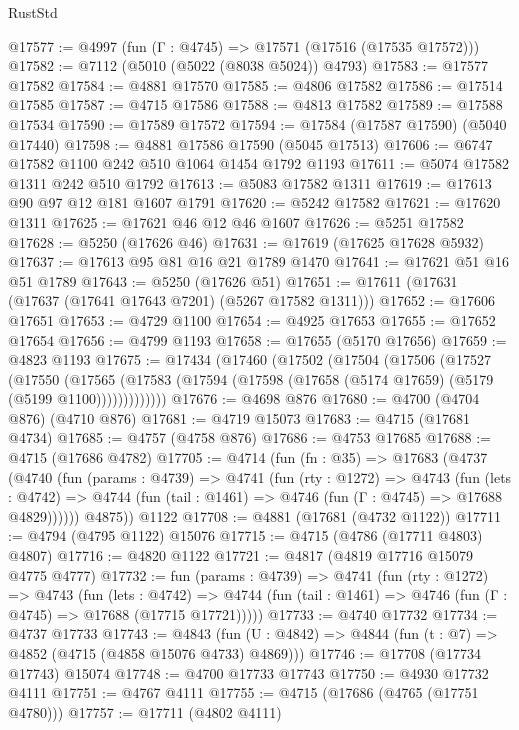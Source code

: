 \begin{lexlean}{RustStd}
\begin{coremodule}
@17577 := @4997 (fun (Γ : @4745) => @17571 (@17516 (@17535 @17572)))
@17582 := @7112 (@5010 (@5022 (@8038 @5024)) @4793)
@17583 := @17577 @17582
@17584 := @4881 @17570
@17585 := @4806 @17582
@17586 := @17514 @17585
@17587 := @4715 @17586
@17588 := @4813 @17582
@17589 := @17588 @17534
@17590 := @17589 @17572
@17594 := @17584 (@17587 @17590) (@5040 @17440)
@17598 := @4881 @17586 @17590 (@5045 @17513)
@17606 := @6747 @17582 @1100 @242 @510 @1064 @1454 @1792 @1193
@17611 := @5074 @17582 @1311 @242 @510 @1792
@17613 := @5083 @17582 @1311
@17619 := @17613 @90 @97 @12 @181 @1607 @1791
@17620 := @5242 @17582
@17621 := @17620 @1311
@17625 := @17621 @46 @12 @46 @1607
@17626 := @5251 @17582
@17628 := @5250 (@17626 @46)
@17631 := @17619 (@17625 @17628 @5932)
@17637 := @17613 @95 @81 @16 @21 @1789 @1470
@17641 := @17621 @51 @16 @51 @1789
@17643 := @5250 (@17626 @51)
@17651 := @17611 (@17631 (@17637 (@17641 @17643 @7201) (@5267 @17582 @1311)))
@17652 := @17606 @17651
@17653 := @4729 @1100
@17654 := @4925 @17653
@17655 := @17652 @17654
@17656 := @4799 @1193
@17658 := @17655 (@5170 @17656)
@17659 := @4823 @1193
@17675 := @17434
    (@17460
      (@17502
        (@17504
          (@17506
            (@17527
              (@17550
                (@17565
                  (@17583 (@17594 (@17598 (@17658 (@5174 @17659) (@5179 (@5199 @1100)))))))))))))
@17676 := @4698 @876
@17680 := @4700 (@4704 @876) (@4710 @876)
@17681 := @4719 @15073
@17683 := @4715 (@17681 @4734)
@17685 := @4757 (@4758 @876)
@17686 := @4753 @17685
@17688 := @4715 (@17686 @4782)
@17705 := @4714
    (fun (fn : @35) =>
    @17683
      (@4737
        (@4740
          (fun (params : @4739) =>
          @4741
            (fun (rty : @1272) =>
            @4743
              (fun (lets : @4742) =>
              @4744 (fun (tail : @1461) => @4746 (fun (Γ : @4745) => @17688 @4829))))))
        @4875))
    @1122
@17708 := @4881 (@17681 (@4732 @1122))
@17711 := @4794 (@4795 @1122) @15076
@17715 := @4715 (@4786 (@17711 @4803) @4807)
@17716 := @4820 @1122
@17721 := @4817 (@4819 @17716 @15079 @4775 @4777)
@17732 := fun (params : @4739) =>
  @4741
    (fun (rty : @1272) =>
    @4743
      (fun (lets : @4742) =>
      @4744 (fun (tail : @1461) => @4746 (fun (Γ : @4745) => @17688 (@17715 @17721)))))
@17733 := @4740 @17732
@17734 := @4737 @17733
@17743 := @4843
    (fun (U : @4842) => @4844 (fun (t : @7) => @4852 (@4715 (@4858 @15076 @4733) @4869)))
@17746 := @17708 (@17734 @17743) @15074
@17748 := @4700 @17733 @17743
@17750 := @4930 @17732 @4111
@17751 := @4767 @4111
@17755 := @4715 (@17686 (@4765 (@17751 @4780)))
@17757 := @17711 (@4802 @4111)

\end{coremodule}
\end{lexlean}

